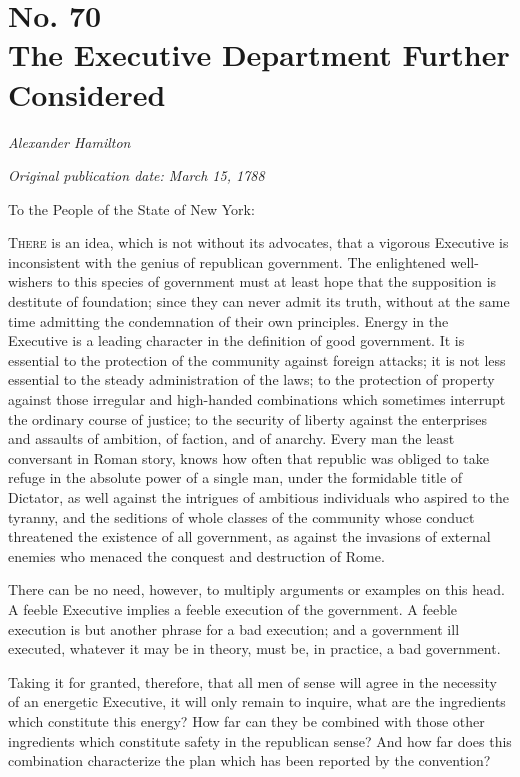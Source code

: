 \chapter[No. 70: The Executive Department Further Considered]{No. 70\\ {\small The Executive Department Further Considered}}

\textit{Alexander Hamilton}

\textit{Original publication date: March 15, 1788}
\vspace{1cm}

To the People of the State of New York:
\vspace{.4cm}

\textsc{There} is an idea, which is not without its advocates, that a vigorous Executive is inconsistent with the genius of republican government. 
The enlightened well-wishers to this species of government must at least hope that the supposition is destitute of foundation; since they can never admit its truth, without at the same time admitting the condemnation of their own principles. 
Energy in the Executive is a leading character in the definition of good government. 
It is essential to the protection of the community against foreign attacks; it is not less essential to the steady administration of the laws; to the protection of property against those irregular and high-handed combinations which sometimes interrupt the ordinary course of justice; to the security of liberty against the enterprises and assaults of ambition, of faction, and of anarchy. 
Every man the least conversant in Roman story, knows how often that republic was obliged to take refuge in the absolute power of a single man, under the formidable title of Dictator, as well against the intrigues of ambitious individuals who aspired to the tyranny, and the seditions of whole classes of the community whose conduct threatened the existence of all government, as against the invasions of external enemies who menaced the conquest and destruction of Rome.

There can be no need, however, to multiply arguments or examples on this head. 
A feeble Executive implies a feeble execution of the government. 
A feeble execution is but another phrase for a bad execution; and a government ill executed, whatever it may be in theory, must be, in practice, a bad government.

Taking it for granted, therefore, that all men of sense will agree in the necessity of an energetic Executive, it will only remain to inquire, what are the ingredients which constitute this energy? 
How far can they be combined with those other ingredients which constitute safety in the republican sense? 
And how far does this combination characterize the plan which has been reported by the convention?

